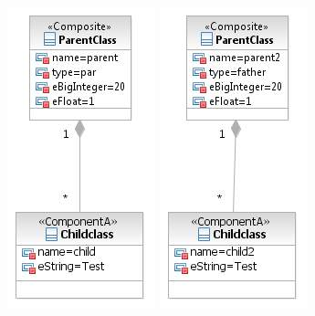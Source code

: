 \documentclass[a4paper]{article}
\begin{document}
\begin{description}
	\includegraphics[scale=0.9]{CompareParentsEqualTypeTestScreens/Testcase02model1.jpeg}
	\includegraphics[scale=0.9]{CompareParentsEqualTypeTestScreens/Testcase02model2.jpeg}
	\end{description}
\end{document}

